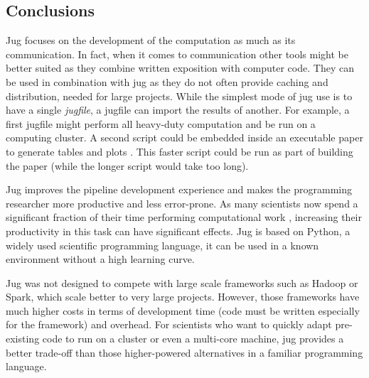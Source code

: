 \documentclass{article}
\begin{document}
\subsection{Conclusions}

Jug focuses on the development of the computation as much as its communication.
In fact, when it comes to communication other tools might be better suited as
they combine written exposition with computer code. They can be used in
combination with jug as they do not often provide caching and distribution,
needed for large projects. While the simplest mode of jug use is to have a
single \textit{jugfile}, a jugfile can import the results of another. For
example, a first jugfile might perform all heavy-duty computation and be run on
a computing cluster. A second script could be embedded inside an executable
paper to generate tables and plots \citep{2011making}. This faster script could
be run as part of building the paper (while the longer script would take too
long).

Jug improves the pipeline development experience and makes the programming
researcher more productive and less error-prone. As many scientists now spend a
significant fraction of their time performing computational work
\citep{prabhu2011a,hannay2009how}, increasing their productivity in this task
can have significant effects.  Jug is based on Python, a widely used scientific
programming language, it can be used in a known environment without a high
learning curve.

Jug was not designed to compete with large scale frameworks such as Hadoop or
Spark, which scale better to very large projects. However, those frameworks
have much higher costs in terms of development time (code must be written
especially for the framework) and overhead. For scientists who want to quickly
adapt pre-existing code to run on a cluster or even a multi-core machine, jug
provides a better trade-off than those higher-powered alternatives in a
familiar programming language.

\printbibliography
\end{document}

